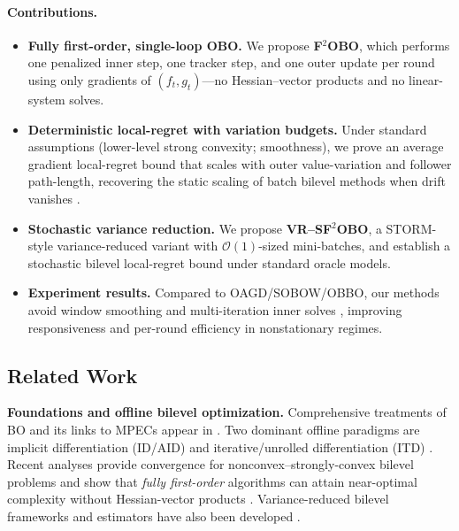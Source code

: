 \documentclass{uai2026} %
\begin{document}
\paragraph{Contributions.}
\begin{itemize}
\item \textbf{Fully first-order, single-loop OBO.} We propose \textbf{F$^2$OBO}, which performs one penalized inner step, one tracker step, and one outer update per round using only gradients of $(f_t,g_t)$—no Hessian--vector products and no linear-system solves.
\item \textbf{Deterministic local-regret with variation budgets.} Under standard assumptions (lower-level strong convexity; smoothness), we prove an average gradient local-regret bound that scales with outer value-variation and follower path-length, recovering the static scaling of batch bilevel methods when drift vanishes \citep{ji2021bilevel,chen2025fullyfirstorder}.
\item \textbf{Stochastic variance reduction.} We propose \textbf{VR--SF$^2$OBO}, a STORM-style variance-reduced variant with $\mathcal{O}(1)$-sized mini-batches, and establish a stochastic bilevel local-regret bound under standard oracle models.
\item \textbf{Experiment results.} Compared to OAGD/SOBOW/OBBO, our methods avoid window smoothing and multi-iteration inner solves \citep{ataee2024oagd,lin2023sobow,bohne2024sobbo}, improving responsiveness and per-round efficiency in nonstationary regimes.
\end{itemize}

\subsection*{Related Work}

\textbf{Foundations and offline bilevel optimization.}
Comprehensive treatments of BO and its links to MPECs appear in \citet{dempe2002foundations,colson2007overview}. 
Two dominant offline paradigms are implicit differentiation (ID/AID) \citep{pedregosa2016hyperparameter,gould2016argmin,lorraine2020implicit} and iterative/unrolled differentiation (ITD) \citep{maclaurin2015reversible,franceschi2017forwardreverse,franceschi2018bilevel}. 
Recent analyses provide convergence for nonconvex--strongly-convex bilevel problems and show that \emph{fully first-order} algorithms can attain near-optimal complexity without Hessian-vector products \citep{ji2021bilevel,chen2025fullyfirstorder}. 
Variance-reduced bilevel frameworks and estimators have also been developed \citep{dagreou2022framework,fang2018spider,cutkosky2019storm}.
\end{document}
